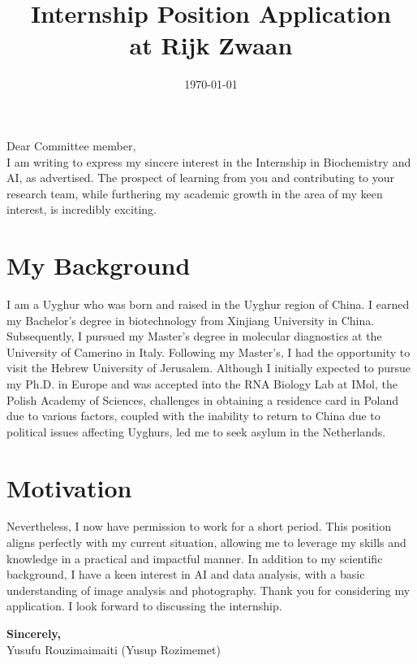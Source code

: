 \documentclass{article}
\title{\textcolor{myblue}{Internship Position Application \\[2ex] \large at Rijk Zwaan}}
\author{}
\date{\textcolor{myblue}{\today}}
\begin{document}
\maketitle

Dear Committee member,
\\[3pt]

I am writing to express my sincere interest in the Internship in Biochemistry and AI, as advertised. The prospect of learning from you and contributing to your research team, while furthering my academic growth in the area of my keen interest, is incredibly exciting.

\section*{My Background}

I am a Uyghur who was born and raised in the Uyghur region of China. I earned my Bachelor's degree in biotechnology from Xinjiang University in China. Subsequently, I pursued my Master's degree in molecular diagnostics at the University of Camerino in Italy. Following my Master's, I had the opportunity to visit the Hebrew University of Jerusalem. Although I initially expected to pursue my Ph.D. in Europe and was accepted into the RNA Biology Lab at IMol, the Polish Academy of Sciences, challenges in obtaining a residence card in Poland due to various factors, coupled with the inability to return to China due to political issues affecting Uyghurs, led me to seek asylum in the Netherlands.

\section*{Motivation}
Nevertheless, I now have permission to work for a short period. This position aligns perfectly with my current situation, allowing me to leverage my skills and knowledge in a practical and impactful manner. In addition to my scientific background, I have a keen interest in AI and data analysis, with a basic understanding of image analysis and photography. Thank you for considering my application. I look forward to discussing the internship.

\textbf{Sincerely,}
\\[15pt]
\textcolor{myblue}{Yusufu Rouzimaimaiti (Yusup Rozimemet)\\
}
\end{document}
